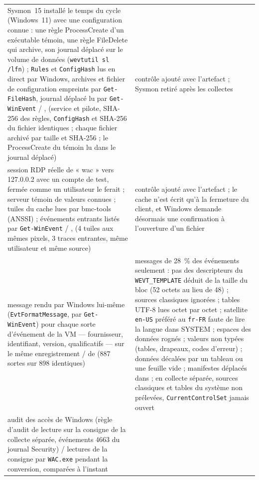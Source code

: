 \documentclass[11pt,a4paper,oneside]{report}
\begin{document}
\begin{longtable}{@{}L{6.6cm}L{8.4cm}@{}}
Sysmon~15 installé le temps du cycle (Windows~11) avec une configuration
  connue : une règle ProcessCreate d'un exécutable témoin, une règle
  FileDelete qui archive, son journal déplacé sur le volume de données
  (\texttt{wevtutil sl /lfn}) ; \texttt{Rules} et \texttt{ConfigHash} lus en
  direct par Windows, archives et fichier de configuration empreints par
  \texttt{Get-FileHash}, journal déplacé lu par \texttt{Get-WinEvent} /
  ,  (service et pilote, SHA-256 des
  règles, \texttt{ConfigHash} et SHA-256 du fichier identiques ; chaque fichier
  archivé par taille et SHA-256 ; le ProcessCreate du témoin lu dans le
  journal déplacé) &
  contrôle ajouté avec l'artefact ; Sysmon retiré après les collectes \\
session RDP réelle de « wac » vers 127.0.0.2 avec un compte de test, fermée
  comme un utilisateur le ferait ; serveur témoin de valeurs connues ; tuiles du
  cache lues par bmc-tools (ANSSI) ; événements entrants listés par
  \texttt{Get-WinEvent} / , 
  (4 tuiles aux mêmes pixels, 3 traces entrantes, même utilisateur et même
  source) &
  contrôle ajouté avec l'artefact ; le cache n'est écrit qu'à la fermeture du
  client, et Windows demande désormais une confirmation à l'ouverture d'un
  fichier  \\
message rendu par Windows lui-même (\texttt{EvtFormatMessage}, par
  \texttt{Get-WinEvent}) pour chaque sorte d'événement de la VM — fournisseur,
  identifiant, version, qualificatifs — sur le même enregistrement /
   de  (887 sortes sur 898
  identiques) &
  messages de 28~\% des événements seulement : pas des descripteurs du
  \texttt{WEVT\_TEMPLATE} déduit de la taille du bloc (52 octets au lieu de
  48) ; sources classiques ignorées ; tables UTF-8 lues octet par octet ;
  satellite \texttt{en-US} préféré au \texttt{fr-FR} faute de lire la langue
  dans SYSTEM ; espaces des données rognés ; valeurs non typées (tables,
  drapeaux, codes d'erreur) ; données décalées par un tableau ou une feuille
  vide ; manifestes déplacés dans  ; en collecte
  séparée, sources classiques et tables du système non prélevées,
  \texttt{CurrentControlSet} jamais ouvert \\
audit des accès de Windows (règle d'audit de lecture sur la consigne de la
  collecte séparée, événements 4663 du journal Security) / lectures de la
  consigne par \texttt{WAC.exe} pendant la conversion, comparées à l'instant

\end{longtable}
\end{document}

